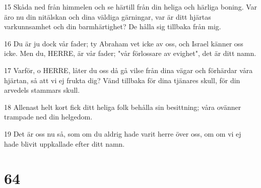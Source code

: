 \par 15 Skåda ned från himmelen och se härtill från din heliga och härliga boning. Var äro nu din nitälskan och dina väldiga gärningar, var är ditt hjärtas varkunnsamhet och din barmhärtighet? De hålla sig tillbaka från mig.
\par 16 Du är ju dock vår fader; ty Abraham vet icke av oss, och Israel känner oss icke. Men du, HERRE, är vår fader; "vår förlossare av evighet", det är ditt namn.
\par 17 Varför, o HERRE, låter du oss då gå vilse från dina vägar och förhärdar våra hjärtan, så att vi ej frukta dig? Vänd tillbaka för dina tjänares skull, för din arvedels stammars skull.
\par 18 Allenast helt kort fick ditt heliga folk behålla sin besittning; våra ovänner trampade ned din helgedom.
\par 19 Det är oss nu så, som om du aldrig hade varit herre över oss, om om vi ej hade blivit uppkallade efter ditt namn.

\chapter{64}

